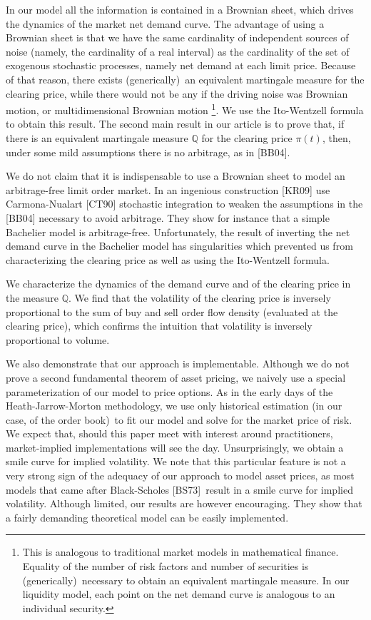 \documentclass{article}
\begin{document}
In our model all the information is contained in a Brownian sheet, which
drives the dynamics of the market net demand curve. The advantage of using a
Brownian sheet is that we have the same cardinality of independent sources
of noise (namely, the cardinality of a real interval) as the cardinality of
the set of exogenous stochastic processes, namely net demand at each limit
price. Because of that reason, there exists (generically)\ an equivalent
martingale measure for the clearing price, while there would not be any if
the driving noise was Brownian motion, or multidimensional Brownian motion%
\footnote{%
This is analogous to traditional market models in mathematical finance.
Equality of the number of risk factors and number of securities is
(generically)\ necessary to obtain an equivalent martingale measure. In our
liquidity model, each point on the net demand curve is analogous to an
individual security.}. We use the Ito-Wentzell formula to obtain this
result. The second main result in our article is to prove that, if there is
an equivalent martingale measure $\mathbb{Q}$ for the clearing price $\pi
(t) $, then, under some mild assumptions there is no arbitrage, as in [BB04].

We do not claim that it is indispensable to use a Brownian sheet to model an
arbitrage-free limit order market. In an ingenious construction [KR09] use
Carmona-Nualart [CT90] stochastic integration to weaken the assumptions in
the [BB04] necessary to avoid arbitrage. They show for instance that a
simple Bachelier model is arbitrage-free. Unfortunately, the result of
inverting the net demand curve in the Bachelier model has singularities
which prevented us from characterizing the clearing price as well as using
the Ito-Wentzell formula.

We characterize the dynamics of the demand curve and of the clearing price
in the measure $\mathbb{Q}$. We find that the volatility of the clearing
price is inversely proportional to the sum of buy and sell order flow
density (evaluated at the clearing price), which confirms the intuition that
volatility is inversely proportional to volume.

We also demonstrate that our approach is implementable. Although we do not
prove a second fundamental theorem of asset pricing, we naively use a
special parameterization of our model to price options. As in the early days
of the Heath-Jarrow-Morton methodology, we use only historical estimation
(in our case, of the order book)\ to fit our model and solve for the market
price of risk. We expect that, should this paper meet with interest around
practitioners, market-implied implementations will see the day.
Unsurprisingly, we obtain a smile curve for implied volatility. We note that
this particular feature is not a very strong sign of the adequacy of our
approach to model asset prices, as most models that came after Black-Scholes
[BS73]\ result in a smile curve for implied volatility. Although limited,
our results are however encouraging. They show that a fairly demanding
theoretical model can be easily implemented.
\end{document}
